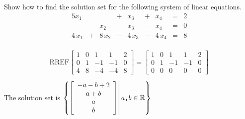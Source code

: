 
\begin{exerciseStatement}


Show how to find the solution set for the following system of linear equations. 
\begin{alignat*}{5} x_{1} & &  &+& x_{3} &+& x_{4} &=& 2 \\ & & x_{2} &-& x_{3} &-& x_{4} &=& 0 \\4 \, x_{1} &+& 8 \, x_{2} &-& 4 \, x_{3} &-& 4 \, x_{4} &=& 8 \\ \end{alignat*}
            


\end{exerciseStatement}
    
\begin{exerciseAnswer} 
\[\mathrm{RREF} \left[\begin{array}{cccc|c}
1 & 0 & 1 & 1 & 2 \\
0 & 1 & -1 & -1 & 0 \\
4 & 8 & -4 & -4 & 8
\end{array}\right]  =  \left[\begin{array}{cccc|c}
1 & 0 & 1 & 1 & 2 \\
0 & 1 & -1 & -1 & 0 \\
0 & 0 & 0 & 0 & 0
\end{array}\right] \]

The solution set is \( \left\{ \left[\begin{array}{c}
-a - b + 2 \\
a + b \\
a \\
b
\end{array}\right] \middle|\,a\text{\texttt{,}}b\in\mathbb{R}\right\} \)


\end{exerciseAnswer}
    
